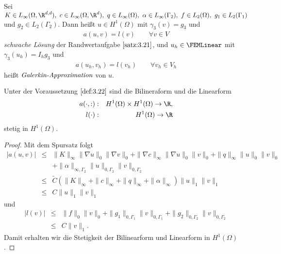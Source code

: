 \begin{Definition}
    \label{def:3.22}
    Sei $K\in L_\infty(\Omega, \R^{d,d}), \ c\in L_\infty(\Omega, \R^d), \ q\in
    L_\infty(\Omega), \ \alpha\in L_\infty(\Gamma_2), \ f\in L_2(\Omega), \
    g_1\in L_2(\Gamma_1)$ und $g_2\in L_2(\Gamma_2)$.
    Dann hei\ss{}t $u\in H^1(\Omega)$ mit $\gamma_3(v) = g_3$ und
    \begin{eqnarray*}
        a(u,v) = l(v) \qquad \forall v\in V
    \end{eqnarray*}
    \emph{schwache Lösung} der Randwertaufgabe $\eqref{satz:3.21}$, und
    $u_h\in \FEMLinear$ mit $\gamma_3(u_h) = I_h g_3$ und
    \begin{eqnarray*}
        a(u_h,v_h) = l(v_h) \qquad \forall v_h\in V_h
    \end{eqnarray*}
    hei\ss{}t $\emph{Galerkin-Approximation}$ von $u$.
\end{Definition}


\begin{Lemma}
    \label{lem:3.23}
    Unter der Voraussetzung $\eqref{def:3.22}$ sind die Bilineraform und die
    Linearform
    \begin{eqnarray*}
        a(\cdot,:)&:& H^1(\Omega) \times H^1(\Omega) \to \R, \\
        l(\cdot)&:& H^1(\Omega) \to \R
    \end{eqnarray*}
    stetig in $H^1(\Omega)$.
\end{Lemma}


\begin{proof}
    Mit dem Spursatz folgt
    \begin{eqnarray*}
              |a(u,v)|
        &\le& \|K\|_\infty \|\nabla u\|_0 \|\nabla v\|_0 + \|\nabla c\|_\infty
              \|\nabla u\|_0 \|v\|_0 + \|q\|_\infty \|u\|_0 \|v\|_0 \\
              &&+ \|\alpha\|_{\infty,\Gamma_2} \|u\|_{0,\Gamma_2}
              \|v\|_{0,\Gamma_2}
              \\
        &\le& \tilde{C}(\|K\|_\infty + \|c\|_\infty + \|q\|_\infty + \|\alpha\|_\infty)
              \|u\|_1 \|v\|_1 \\
        &\le& C \|u\|_1 \|v\|_1
    \end{eqnarray*}
    und
    \begin{eqnarray*}
              |l(v)|
        &\le& \|f\|_0 \|v\|_0 + \|g_1\|_{0,\Gamma_1} \|v\|_{0,\Gamma_1} +
              \|g_2\|_{0,\Gamma_2} \|v\|_{0,\Gamma_2} \\
        &\le& C \|v\|_1.
    \end{eqnarray*}
    Damit erhalten wir die Stetigkeit der Bilinearform und Linearform in
    $H^1(\Omega)$.
\end{proof}


